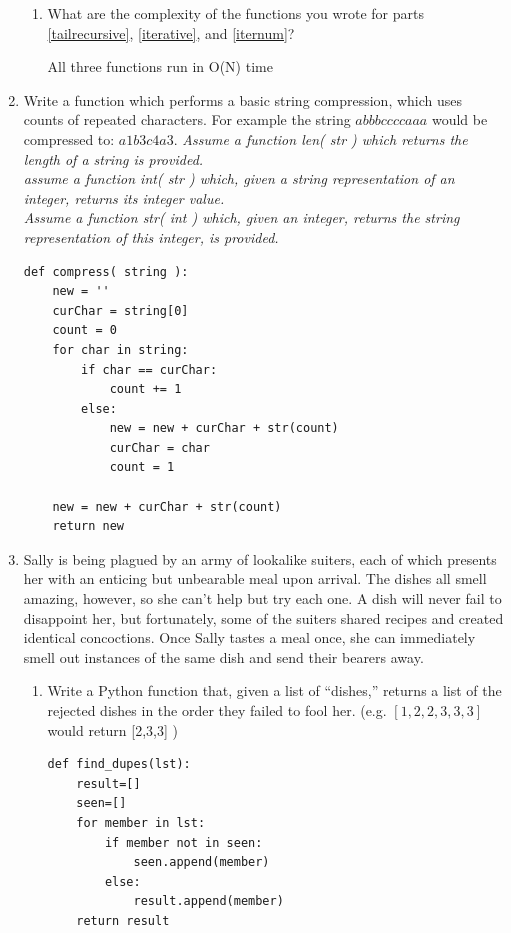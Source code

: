 \documentclass[11pt]{article}
\newenvironment{answer}{\large\lstset{basicstyle=\large}\color{white}}{}
\newenvironment{answer}{\large\lstset{basicstyle=\large}\color{red}}{}
\begin{document}
\begin{enumerate}
\begin{enumerate}
\item
What are the complexity of the functions you wrote for parts \ref{tailrecursive}, \ref{iterative}, and \ref{iternum}?
\begin{answer}

All three functions run in O(N) time \\
\end{answer}
\end{enumerate}

\item Write a function which performs a basic string compression, which uses counts of repeated characters. For example 
the string $abbbccccaaa$ would be compressed to: $a1b3c4a3$. 
 \emph{Assume a function len( str ) which returns the length of a string is provided. \\
      assume a function int( str ) which, given a string representation of an integer, returns its integer value. \\
      Assume a function str( int ) which, given an integer, returns the string representation of this integer, is provided. }

\begin{answer}
\begin{lstlisting}
def compress( string ):
    new = ''
    curChar = string[0]
    count = 0
    for char in string:
        if char == curChar:
            count += 1
        else:
            new = new + curChar + str(count)
            curChar = char
            count = 1 

    new = new + curChar + str(count)
    return new
\end{lstlisting}
\end{answer}

\newpage


\newpage
\item
Sally is being plagued by an army of lookalike suiters, each of which presents her with an enticing but unbearable meal upon arrival.
The dishes all smell amazing, however, so she can't help but try each one.
A dish will never fail to disappoint her, but fortunately, some of the suiters shared recipes and created identical concoctions.
Once Sally tastes a meal once, she can immediately smell out instances of the same dish and send their bearers away.
\begin{enumerate}
\item
\label{listdupes}
Write a Python function that, given a list of ``dishes,'' returns a list of the rejected dishes in the order they failed to fool her. (e.g. $[1, 2, 2, 3, 3, 3]$ would return [2,3,3] )
\begin{answer}
\begin{lstlisting}
def find_dupes(lst):
	result=[]
	seen=[]
	for member in lst:
		if member not in seen:
			seen.append(member)
		else:
			result.append(member)
	return result
\end{lstlisting}
\end{answer}


\end{enumerate}
\end{enumerate}
\end{document}
